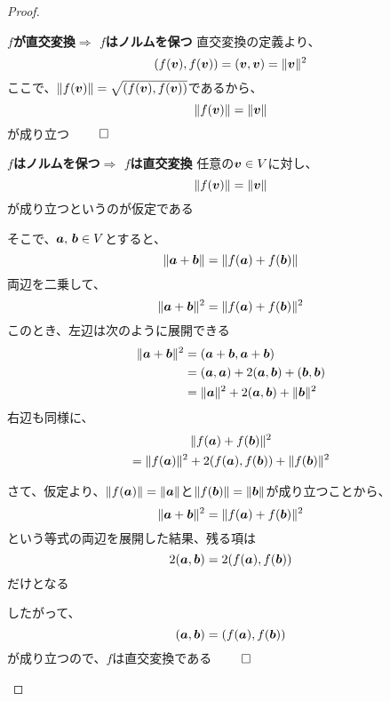 \documentclass[../../../topic_linear-algebra]{subfiles}
\begin{document}
\begin{proof}
  \begin{subpattern}{\bfseries $f$が直交変換$\Longrightarrow$ $f$はノルムを保つ}
    直交変換の定義より、
    \begin{equation*}
      (f(\vb*{v}),f(\vb*{v})) = (\vb*{v},\vb*{v}) = \|\vb*{v}\|^2
    \end{equation*}
    ここで、$\|f(\vb*{v})\| = \sqrt{(f(\vb*{v}),f(\vb*{v}))}$であるから、
    \begin{equation*}
      \|f(\vb*{v})\| = \|\vb*{v}\|
    \end{equation*}
    が成り立つ $\qed$
  \end{subpattern}

  \begin{subpattern}{\bfseries $f$はノルムを保つ$\Longrightarrow$ $f$は直交変換}
    任意の$\vb*{v} \in V$に対し、
    \begin{equation*}
      \|f(\vb*{v})\| = \|\vb*{v}\|
    \end{equation*}
    が成り立つというのが仮定である

    そこで、$\vb*{a},\,\vb*{b} \in V$とすると、
    \begin{equation*}
      \|\vb*{a} + \vb*{b} \| = \|f(\vb*{a}) + f(\vb*{b})\|
    \end{equation*}
    両辺を二乗して、
    \begin{equation*}
      \|\vb*{a} + \vb*{b} \|^2 = \|f(\vb*{a}) + f(\vb*{b})\|^2
    \end{equation*}
    このとき、左辺は次のように展開できる
    \begin{align*}
      \|\vb*{a} + \vb*{b} \|^2 & = (\vb*{a} + \vb*{b},\vb*{a} + \vb*{b})                      \\
                               & = (\vb*{a},\vb*{a}) + 2(\vb*{a},\vb*{b}) + (\vb*{b},\vb*{b}) \\
                               & = \|\vb*{a}\|^2 + 2(\vb*{a},\vb*{b}) + \|\vb*{b}\|^2
    \end{align*}
    右辺も同様に、
    \begin{multline*}
      \|f(\vb*{a}) + f(\vb*{b})\|^2 \\= \|f(\vb*{a})\|^2 + 2(f(\vb*{a}),f(\vb*{b})) + \|f(\vb*{b})\|^2
    \end{multline*}

    さて、仮定より、$\|f(\vb*{a})\| = \|\vb*{a}\|$と$\|f(\vb*{b})\| = \|\vb*{b}\|$が成り立つことから、
    \begin{equation*}
      \|\vb*{a} + \vb*{b} \|^2 = \|f(\vb*{a}) + f(\vb*{b})\|^2
    \end{equation*}
    という等式の両辺を展開した結果、残る項は
    \begin{equation*}
      2 (\vb*{a},\vb*{b}) = 2(f(\vb*{a}),f(\vb*{b}))
    \end{equation*}
    だけとなる

    したがって、
    \begin{equation*}
      (\vb*{a},\vb*{b}) = (f(\vb*{a}),f(\vb*{b}))
    \end{equation*}
    が成り立つので、$f$は直交変換である $\qed$
  \end{subpattern}
\end{proof}
\end{document}
